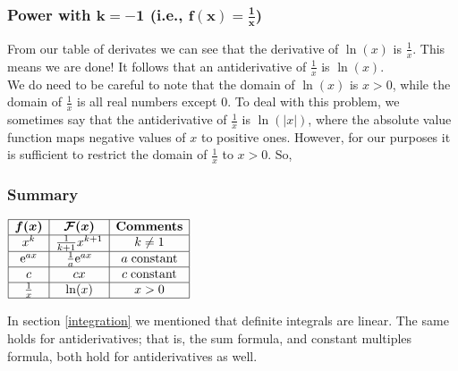   	\bigskip
	
	\hfil{}
	\bigskip
	\bigskip

\subsubsection{Power with $\boldsymbol{k = -1}$ (i.e., $\boldsymbol{f(x) = \frac{1}{x}}$)}
From our table of derivates we can see that the derivative of $\ln(x)$ is $\frac{1}{x}$. This means we are done! It follows that an antiderivative of $\frac{1}{x}$ is $\ln(x)$. \\

\noindent We do need to be careful to note that the domain of $\ln(x)$ is $x > 0$, while the domain of $\frac{1}{x}$ is all real numbers except $0$. To deal with this problem, we sometimes say that the antiderivative of $\frac{1}{x}$ is $\ln(|x|)$, where the absolute value function maps negative values of $x$ to positive ones. However, for our purposes it is sufficient to restrict the domain of $\frac{1}{x}$ to $x > 0$. So,

  	\bigskip
	
	\hfil{}
	\bigskip
	\bigskip

\subsubsection{Summary}

\begin{center}
$\begin{array}{|c|c|c|} \hline
 \boldsymbol{f(x)} & \boldsymbol{\mathcal{F}(x)} & \textbf{Comments} \\ \hline
x^k				& \frac{1}{k+1}x^{k+1} 	& k \neq 1 \\ \hline
\mathrm{e}^{ax}			& \frac{1}{a}\mathrm{e}^{ax}		& a \; \text{constant}\\ \hline
c 				& cx 						& c \; \text{constant} \\ \hline
\frac{1}{x}		& \ln(x) 					& x > 0	  	      \\	\hline
\end{array}$
\end{center}
In section \ref{integration} we mentioned that definite integrals are linear. The same holds for antiderivatives; that is, the sum formula, and constant multiples formula, both hold for antiderivatives as well.

